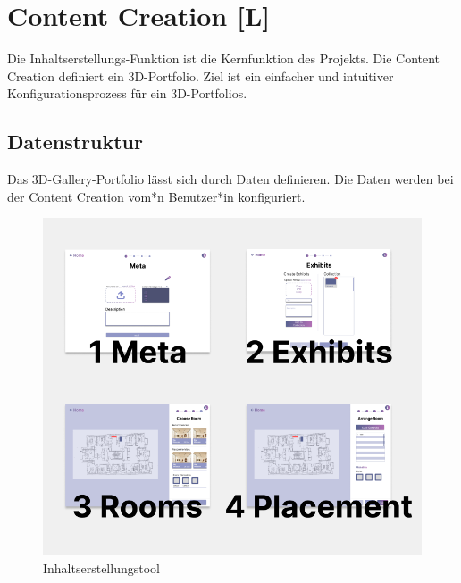 \section{Content Creation [L]}
Die Inhaltserstellungs-Funktion ist die Kernfunktion des Projekts. Die Content Creation definiert ein 3D-Portfolio. Ziel ist ein einfacher und intuitiver Konfigurationsprozess für ein 3D-Portfolios. 

\subsection{Datenstruktur}
Das 3D-Gallery-Portfolio lässt sich durch Daten definieren. Die Daten werden bei der Content Creation vom*n Benutzer*in konfiguriert. 

\begin{figure}[ht]
    \centering
    \includegraphics[scale=0.4]{pics/CreateCreation4Categories.png}
    \caption{Inhaltserstellungstool}
    \label{fig:impl:creation:fourCategoires}
\end{figure}

